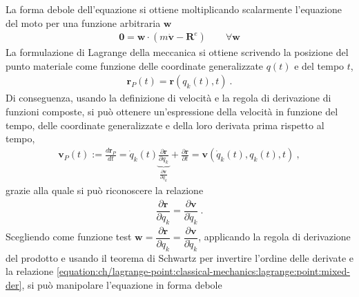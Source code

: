 \documentclass[letterpaper,10pt,english]{jupyterBook}
\begin{document}
\sphinxAtStartPar
{} La forma debole dell’equazione si ottiene moltiplicando scalarmente l’equazione del moto per una funzione arbitraria \(\mathbf{w}\)
\begin{equation*}
\begin{split}\mathbf{0} = \mathbf{w} \cdot \left( m \dot{\mathbf{v}} - \mathbf{R}^e\right)  \qquad \forall \mathbf{w}\end{split}
\end{equation*}
\sphinxAtStartPar
{} La formulazione di Lagrange della meccanica si ottiene scrivendo la posizione del punto materiale come funzione delle coordinate generalizzate \(q(t)\) e del tempo \(t\),
\begin{equation*}
\begin{split}\mathbf{r}_P(t) = \mathbf{r}(q_k(t),t) \ .\end{split}
\end{equation*}
\sphinxAtStartPar
Di conseguenza, usando la definizione di velocità e la regola di derivazione di funzioni composte, si può ottenere un’espressione della velocità in funzione del tempo, delle coordinate generalizzate e della loro derivata prima rispetto al tempo,
\begin{equation*}
\begin{split}\mathbf{v}_P(t) := \frac{d\mathbf{r}_P}{dt} = \dot{q}_k(t) \underbrace{\frac{\partial \mathbf{r}}{\partial q_k}}_{\frac{\partial \mathbf{v}}{\partial \dot{q}_k}} + \frac{\partial \mathbf{r}}{\partial t} = \mathbf{v}\left(\dot{q}_k(t), q_k(t), t \right) \ ,\end{split}
\end{equation*}
\sphinxAtStartPar
grazie alla quale si può riconoscere la relazione
\begin{equation}\label{equation:ch/lagrange-point:classical-mechanics:lagrange:point:mixed-der}
\begin{split}\dfrac{\partial \mathbf{r}}{\partial q_k} = \dfrac{\partial \mathbf{v}}{\partial \dot{q}_k} \ .\end{split}
\end{equation}
\sphinxAtStartPar
Scegliendo come funzione test \(\mathbf{w} = \dfrac{\partial \mathbf{r}}{\partial q_k} = \dfrac{\partial \mathbf{v}}{\partial \dot{q}_k}\), applicando la regola di derivazione del prodotto e usando il teorema di Schwartz per invertire l’ordine delle derivate e la relazione \eqref{equation:ch/lagrange-point:classical-mechanics:lagrange:point:mixed-der}, si può manipolare l’equazione in forma debole
\end{document}
